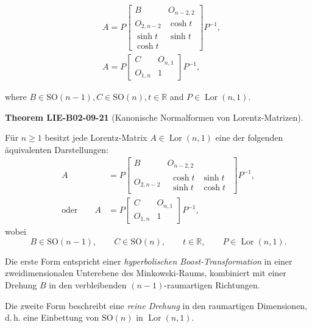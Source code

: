 \documentclass[10pt, letterpaper]{article}
\newcommand{\CustomHeading}[3]{%
  \par\medskip\noindent%
  \textbf{#1 #2} \textnormal{(#3)}.\enskip%
}
\newenvironment{THEO}[2]{\begin{unitbox}\CustomHeading{Theorem}{#1}{#2}}{\end{unitbox}}
\begin{document}
$$
\begin{aligned}
& A=P\left[\begin{array}{cc}
B & O_{n-2,2} \\
O_{2, n-2} & \cosh t \\
\sinh t & \sinh t \\
\cosh t
\end{array}\right] P^{-1}, \\
& A=P\left[\begin{array}{cc}
C & O_{n, 1} \\
O_{1, n} & 1
\end{array}\right] P^{-1},
\end{aligned}
$$

where $B \in \mathrm{SO}(n-1), C \in \mathrm{SO}(n), t \in \mathbb{R}$ and $P \in \operatorname{Lor}(n, 1)$.


\begin{THEO}{LIE-B02-09-21}{Kanonische Normalformen von Lorentz-Matrizen}
Für \(n \geq 1\) besitzt jede Lorentz-Matrix
\(A \in \operatorname{Lor}(n,1)\)
eine der folgenden äquivalenten Darstellungen:
\[
\begin{aligned}
A
&=
P
\begin{bmatrix}
B & O_{n-2,2}\\[2pt]
O_{2,n-2} &
\begin{array}{cc}
\cosh t & \sinh t\\[2pt]
\sinh t & \cosh t
\end{array}
\end{bmatrix}
P^{-1},
\\[8pt]
\text{oder} \qquad
A
&=
P
\begin{bmatrix}
C & O_{n,1}\\[2pt]
O_{1,n} & 1
\end{bmatrix}
P^{-1},
\end{aligned}
\]
wobei
\[
B \in \mathrm{SO}(n-1), \qquad
C \in \mathrm{SO}(n), \qquad
t \in \mathbb{R}, \qquad
P \in \operatorname{Lor}(n,1).
\]

Die erste Form entspricht einer \emph{hyperbolischen Boost-Transformation} in einer
zweidimensionalen Unterebene des Minkowski-Raums, kombiniert mit einer Drehung \(B\)
in den verbleibenden \((n-1)\)-raumartigen Richtungen.

Die zweite Form beschreibt eine \emph{reine Drehung} in den raumartigen Dimensionen,
d.\,h. eine Einbettung von \(\mathrm{SO}(n)\) in \(\operatorname{Lor}(n,1)\).
\end{THEO}
\end{document}
